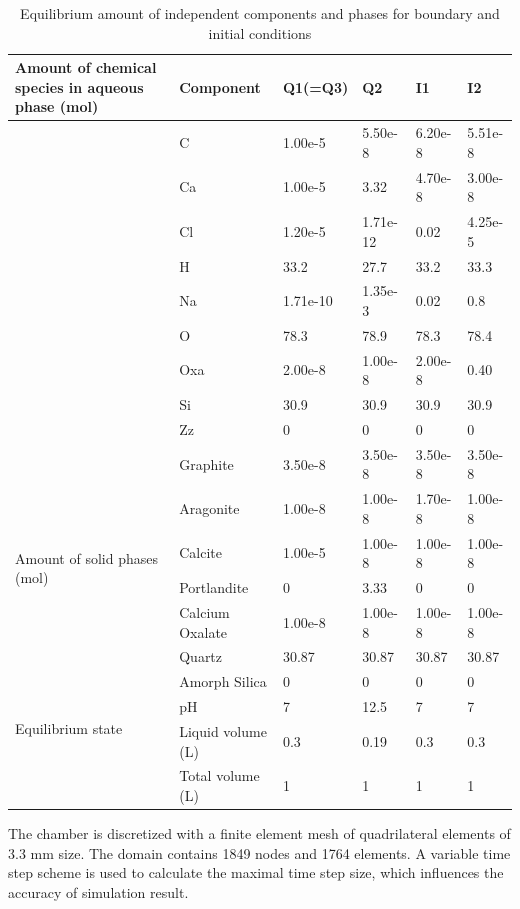 \begin{table}[h]
\caption{Equilibrium amount of independent components and phases for boundary and initial conditions}
\begin{tabular}{p{2cm}lllll}
\hline
\multirow{10}{2cm}{Amount of chemical species in aqueous phase (mol)}
  & Component & Q1(=Q3) & Q2      & I1      & I2      \\
\hline
  & C         & 1.00e-5 & 5.50e-8 & 6.20e-8 & 5.51e-8 \\
  & Ca        & 1.00e-5 & 3.32    & 4.70e-8 & 3.00e-8 \\
  & Cl        & 1.20e-5 & 1.71e-12& 0.02    & 4.25e-5 \\
  & H         & 33.2    & 27.7    & 33.2    & 33.3    \\
  & Na        & 1.71e-10& 1.35e-3 & 0.02    & 0.8     \\
  & O         & 78.3    & 78.9    & 78.3    & 78.4    \\
  & Oxa       & 2.00e-8 & 1.00e-8 & 2.00e-8 & 0.40    \\
  & Si        & 30.9    & 30.9    & 30.9    & 30.9    \\
  & Zz        & 0       & 0       & 0       & 0       \\
\hline
\multirow{7}{2cm}{Amount of solid phases (mol)}
  & Graphite  & 3.50e-8 & 3.50e-8 & 3.50e-8 & 3.50e-8 \\
  & Aragonite & 1.00e-8 & 1.00e-8 & 1.70e-8 & 1.00e-8 \\ 
  & Calcite   & 1.00e-5 & 1.00e-8 & 1.00e-8 & 1.00e-8 \\
  &Portlandite& 0       & 3.33    & 0       & 0       \\
  &Calcium Oxalate&1.00e-8&1.00e-8&1.00e-8  &1.00e-8  \\
  &Quartz     & 30.87   & 30.87   & 30.87   & 30.87   \\
  &Amorph Silica& 0     & 0       & 0       & 0       \\
\hline
\multirow{2}{2cm}{Equilibrium state}
  &pH         & 7       & 12.5    & 7       & 7       \\
  &Liquid volume (L)&0.3& 0.19    & 0.3     & 0.3     \\
  &Total volume  (L)&1  & 1       & 1       & 1       \\
\hline
\end{tabular}
\label{tab:comedy_gems_sys}
\end{table}

The chamber is discretized with a finite element mesh of quadrilateral elements of 3.3 mm size. The domain contains 1849 nodes and 1764 elements. A variable time step scheme is used to calculate the maximal time step size, which influences the accuracy of simulation result. 

